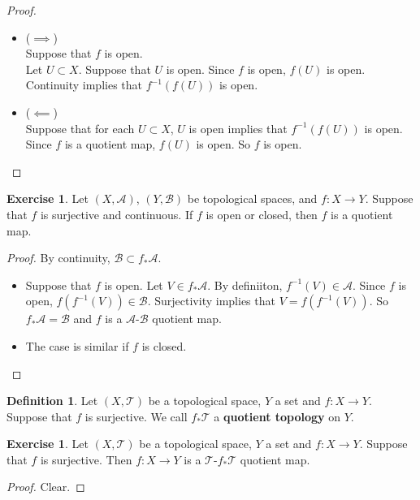 \documentclass[12pt]{amsart}
\theoremstyle{definition}
\newtheorem{defn}[definition]{Definition}
\newtheorem{ex}[definition]{Exercise}
\newcommand{\MA}{\mathcal{A}}
\newcommand{\MB}{\mathcal{B}}
\newcommand{\MT}{\mathcal{T}}
\newcommand{\lex}[1]{\label{ex:#1}}
\newcommand{\ld}[1]{\label{defn:#1}}
\begin{document}
	\begin{proof}\
	\begin{itemize}	
	\item ($\implies$) \\
	Suppose that $f$ is open.\\
	Let $U \subset X$. Suppose that $U$ is open. Since $f$ is open, $f(U)$ is open. Continuity implies that $f^{-1}(f(U))$ is open.\\ 
	\item ($\impliedby$) \\
	Suppose that for each $U \subset X$, $U$ is open implies that $f^{-1}(f(U))$ is open. \\
	Since $f$ is a quotient map, $f(U)$ is open. So $f$ is open.
	
	\end{itemize}
	\end{proof}
	
	\begin{ex} \lex{34008}
	Let $(X, \MA)$, $(Y, \MB)$ be topological spaces, and $f:X \rightarrow Y$. Suppose that $f$ is surjective and continuous. If $f$ is open or closed, then $f$ is a quotient map.
	\end{ex}
	
	\begin{proof}
	By continuity, $\MB \subset f_*\MA$. 
	\begin{itemize}
	\item Suppose that $f$ is open. Let $V \in f_*\MA$. By definiiton, $f^{-1}(V) \in \MA$. Since $f$ is open, $f(f^{-1}(V)) \in \MB$. Surjectivity implies that $V = f(f^{-1}(V))$. So $f_*\MA = \MB$ and $f$ is a $\MA$-$\MB$ quotient map.
	\item The case is similar if $f$ is closed.
	\end{itemize}
	\end{proof}
	
	
	\begin{defn} \ld{34006}
	Let $(X, \MT)$ be a topological space, $Y$ a set and $f:X \rightarrow Y$. Suppose that $f$ is surjective.	
	 We call $f_* \MT$ a \textbf{quotient topology} on $Y$.  
	\end{defn}
	
	\begin{ex} \lex{34007}
	Let $(X, \MT)$ be a topological space, $Y$ a set and $f:X \rightarrow Y$. Suppose that $f$ is surjective. Then $f: X \rightarrow Y$ is a $\MT$-$f_*\MT$ quotient map. 
	\end{ex}
	
	\begin{proof}
	Clear.
	\end{proof}
	
\end{document}
